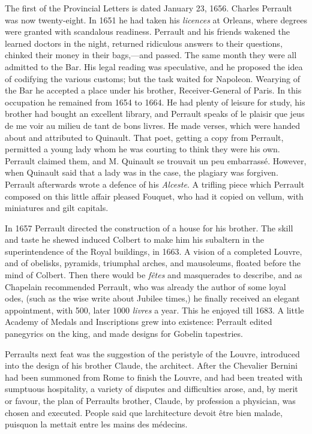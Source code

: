 \documentclass[14pt,a4paper]{memoir}
\begin{document}
The first of the Provincial Letters is dated January 23, 1656. Charles
Perrault was now twenty-eight. In 1651 he had taken his \emph{licences}
at Orleans, where degrees were granted with scandalous readiness.
Perrault and his friends wakened the learned doctors in the night,
returned ridiculous answers to their questions, chinked their money in
their bags,---and passed. The same month they were all admitted to the
Bar. His legal reading was speculative, and he proposed the idea of
codifying the various customs; but the task waited for Napoleon.
Wearying of the Bar he accepted a place under his brother,
Receiver-General of Paris. In this occupation he remained from 1654 to
1664. He had plenty of leisure for study, his brother had bought an
excellent library, and Perrault speaks of \textquotesingle le plaisir
que j\textquotesingle eus de me voir au milieu de tant de bons
livres.\textquotesingle{} He made verses, which were handed about and
attributed to Quinault. That poet, getting a copy from Perrault,
permitted a young lady whom he was courting to think they were his own.
Perrault claimed them, and \textquotesingle M. Quinault se trouvait un
peu embarrassé.\textquotesingle{} However, when Quinault said that a
lady was in the case, the plagiary was forgiven. Perrault afterwards
wrote a defence of his \emph{Alceste}. A trifling piece which Perrault
composed on this little affair pleased Fouquet, who had it copied on
vellum, with miniatures and gilt capitals.

In 1657 Perrault directed the construction of a house for his brother.
The skill and taste he shewed induced Colbert to make him his subaltern
in the superintendence of the Royal buildings, in 1663. A vision of a
completed Louvre, and of \textquotesingle obelisks, pyramids, triumphal
arches, and mausoleums,\textquotesingle{} floated before the mind of
Colbert. Then there would be \emph{fêtes} and masquerades to describe,
and as Chapelain recommended Perrault, who was already the author of
some loyal odes, (such as the wise write about Jubilee times,) he
finally received an elegant appointment, with 500, later 1000
\emph{livres} a year. This he enjoyed till 1683. A little Academy of
Medals and Inscriptions grew into existence: Perrault edited panegyrics
on the king, and made designs for Gobelin tapestries.

Perrault\textquotesingle s next feat was the suggestion of the peristyle
of the Louvre, introduced into the design of his brother Claude, the
architect. After the Chevalier Bernini had been summoned from Rome to
finish the Louvre, and had been treated with sumptuous hospitality, a
variety of disputes and difficulties arose, and, by merit or favour, the
plan of Perrault\textquotesingle s brother, Claude, by profession a
physician, was chosen and executed. People said \textquotesingle que
l\textquotesingle architecture devoit être bien malade,
puisqu\textquotesingle on la mettait entre les mains des
médecins.\textquotesingle{}
\end{document}
